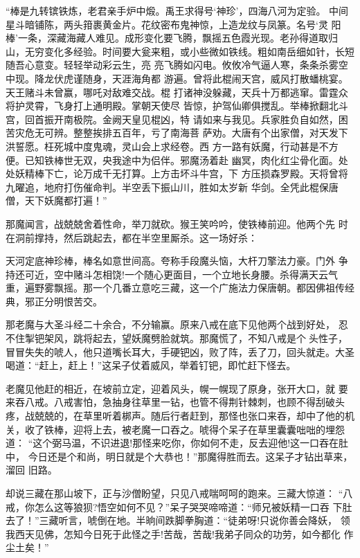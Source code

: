 “棒是九转镔铁炼，老君亲手炉中煅。禹王求得号‘神珍’，四海八河为定验。
中间星斗暗铺陈，两头箝裹黄金片。花纹密布鬼神惊，上造龙纹与凤篆。名号‘灵
阳棒’一条，深藏海藏人难见。成形变化要飞腾，飘摇五色霞光现。老孙得道取归
山，无穷变化多经验。时间要大瓮来粗，或小些微如铁线。粗如南岳细如针，长短
随吾心意变。轻轻举动彩云生，亮
亮飞腾如闪电。攸攸冷气逼人寒，条条杀雾空中现。降龙伏虎谨随身，天涯海角都
游遍。曾将此棍闹天宫，威风打散蟠桃宴。天王赌斗未曾赢，哪吒对敌难交战。棍
打诸神没躲藏，天兵十万都逃窜。雷霆众将护灵霄，飞身打上通明殿。掌朝天使尽
皆惊，护驾仙卿俱搅乱。举棒掀翻北斗宫，回首振开南极院。金阙天皇见棍凶，特
请如来与我见。兵家胜负自如然，困苦灾危无可辨。整整挨排五百年，亏了南海菩
萨劝。大唐有个出家僧，对天发下洪誓愿。枉死城中度鬼魂，灵山会上求经卷。西
方一路有妖魔，行动甚是不方便。已知铁棒世无双，央我途中为侣伴。邪魔汤着赴
幽冥，肉化红尘骨化面。处处妖精棒下亡，论万成千无打算。上方击坏斗牛宫，下
方压损森罗殿。天将曾将九曜追，地府打伤催命判。半空丢下振山川，胜如太岁新
华剑。全凭此棍保唐僧，天下妖魔都打遍！”

那魔闻言，战兢兢舍着性命，举刀就砍。猴王笑吟吟，使铁棒前迎。他两个先
时在洞前撑持，然后跳起去，都在半空里厮杀。这一场好杀：

天河定底神珍棒，棒名如意世间高。夸称手段魔头恼，大杆刀擎法力豪。门外
争持还可近，空中赌斗怎相饶!一个随心更面目，一个立地长身腰。杀得满天云气
重，遍野雾飘摇。那一个几番立意吃三藏，这一个广施法力保唐朝。都因佛祖传经
典，邪正分明恨苦交。

那老魔与大圣斗经二十余合，不分输赢。原来八戒在底下见他两个战到好处，
忍不住掣钯架风，跳将起去，望妖魔劈脸就筑。那魔慌了，不知八戒是个头性子，
冒冒失失的唬人，他只道嘴长耳大，手硬钯凶，败了阵，丢了刀，回头就走。大圣
喝道：“赶上，赶上！”这呆子仗着威风，举着钉钯，即忙赶下怪去。

老魔见他赶的相近，在坡前立定，迎着风头，幌一幌现了原身，张开大口，就
要来吞八戒。八戒害怕，急抽身往草里一钻，也管不得荆针棘刺，也顾不得刮破头
疼，战兢兢的，在草里听着梆声。随后行者赶到，那怪也张口来吞，却中了他的机
关，收了铁棒，迎将上去，被老魔一口吞之。唬得个呆子在草里囊囊咄咄的埋怨道：
“这个弼马温，不识进退!那怪来吃你，你如何不走，反去迎他!这一口吞在肚中，
今日还是个和尚，明日就是个大恭也！”那魔得胜而去。这呆子才钻出草来，溜回
旧路。

却说三藏在那山坡下，正与沙僧盼望，只见八戒喘呵呵的跑来。三藏大惊道：
“八戒，你怎么这等狼狈?悟空如何不见？”呆子哭哭啼啼道：“师兄被妖精一口吞
下肚去了！”三藏听言，唬倒在地。半晌间跌脚拳胸道：“徒弟呀!只说你善会降妖，
领我西天见佛，怎知今日死于此怪之手!苦哉，苦哉!我弟子同众的功劳，如今都化
作尘土矣！”

